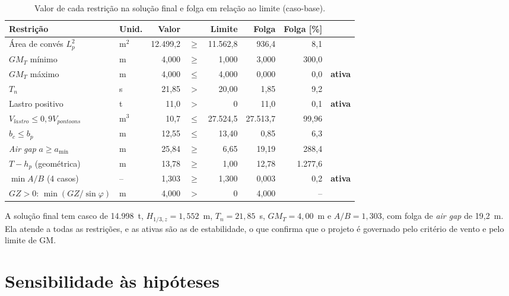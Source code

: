 \documentclass[11pt,a4paper]{article}
\newcommand{\Hz}{H_{1/3,z}}
\newcommand{\amin}{a_{\text{mín}}}
\begin{document}
\begin{table}[!htb]
\centering
\caption[Restrições da solução final e folgas (caso-base)]{Valor de cada restrição na solução final
e folga em relação ao limite (caso-base).}\label{tab:resumo}
\small
\begin{tabular}{llrcrrrl}
\toprule
Restrição & Unid. & Valor & & Limite & Folga & Folga [\%] & \\
\midrule
Área de convés $L_p^2$ & m$^2$ & 12.499,2 & $\ge$ & 11.562,8 & 936,4 & 8,1 & \\
$GM_T$ mínimo & m & 4,000 & $\ge$ & 1,000 & 3,000 & 300,0 & \\
$GM_T$ máximo & m & 4,000 & $\le$ & 4,000 & 0,000 & 0,0 & \textbf{ativa} \\
$T_n$ & s & 21,85 & $>$ & 20,00 & 1,85 & 9,2 & \\
Lastro positivo & t & 11,0 & $>$ & 0 & 11,0 & 0,1 & \textbf{ativa} \\
$V_{lastro} \le 0{,}9 V_{pontoons}$ & m$^3$ & 10,7 & $\le$ & 27.524,5 & 27.513,7 & 99,96 & \\
$b_c \le b_p$ & m & 12,55 & $\le$ & 13,40 & 0,85 & 6,3 & \\
\emph{Air gap} $a \ge \amin$ & m & 25,84 & $\ge$ & 6,65 & 19,19 & 288,4 & \\
$T - h_p$ (geométrica) & m & 13,78 & $\ge$ & 1,00 & 12,78 & 1.277,6 & \\
$\min A/B$ (4 casos) & -- & 1,303 & $\ge$ & 1,300 & 0,003 & 0,2 & \textbf{ativa} \\
$GZ > 0$: $\min(GZ/\sin\varphi)$ & m & 4,000 & $>$ & 0 & 4,000 & -- & \\
\bottomrule
\end{tabular}
\end{table}

\begin{sintese}
A solução final tem casco de 14.998~t, $\Hz = 1{,}552$~m, $T_n = 21{,}85$~s, $GM_T = 4{,}00$~m e
$A/B = 1{,}303$, com folga de \emph{air gap} de 19,2~m. Ela atende a todas as restrições, e as ativas
são as de estabilidade, o que confirma que o projeto é governado pelo critério de vento e pelo
limite de GM.
\end{sintese}

\section{Sensibilidade às hipóteses}\label{sec:sensibilidade}
\end{document}
